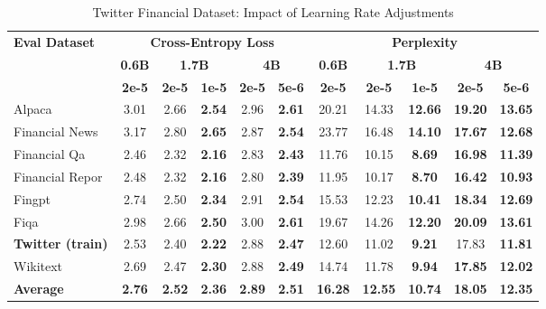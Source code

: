 
\begin{table}[h]
\centering
\caption[Twitter Financial: Learning Rate Comparison]{Twitter Financial Dataset: Impact of Learning Rate Adjustments}
\label{tab:twitter_lr_comparison}
\begin{tabular}{l|c|cc|cc|c|cc|cc}
\hline
\multirow{3}{*}{\textbf{Eval Dataset}} &
\multicolumn{5}{c|}{\textbf{Cross-Entropy Loss}} &
\multicolumn{5}{c}{\textbf{Perplexity}} \\
\cline{2-6} \cline{7-11}
& \textbf{0.6B} & \multicolumn{2}{c|}{\textbf{1.7B}} & \multicolumn{2}{c|}{\textbf{4B}} &
 \textbf{0.6B} & \multicolumn{2}{c|}{\textbf{1.7B}} & \multicolumn{2}{c}{\textbf{4B}} \\
\cline{3-4} \cline{5-6} \cline{8-9} \cline{10-11}
& \textbf{2e-5} & \textbf{2e-5} & \textbf{1e-5} & \textbf{2e-5} & \textbf{5e-6} &
 \textbf{2e-5} & \textbf{2e-5} & \textbf{1e-5} & \textbf{2e-5} & \textbf{5e-6} \\
\hline
 Alpaca & 3.01 & 2.66 & \textbf{2.54} & 2.96 & \textbf{2.61} & 20.21 & 14.33 & \textbf{12.66} & \textbf{19.20} & \textbf{13.65} \\
Financial News & 3.17 & 2.80 & \textbf{2.65} & 2.87 & \textbf{2.54} & 23.77 & 16.48 & \textbf{14.10} & \textbf{17.67} & \textbf{12.68} \\
Financial Qa & 2.46 & 2.32 & \textbf{2.16} & 2.83 & \textbf{2.43} & 11.76 & 10.15 & \textbf{8.69} & \textbf{16.98} & \textbf{11.39} \\
Financial Repor & 2.48 & 2.32 & \textbf{2.16} & 2.80 & \textbf{2.39} & 11.95 & 10.17 & \textbf{8.70} & \textbf{16.42} & \textbf{10.93} \\
Fingpt & 2.74 & 2.50 & \textbf{2.34} & 2.91 & \textbf{2.54} & 15.53 & 12.23 & \textbf{10.41} & \textbf{18.34} & \textbf{12.69} \\
Fiqa & 2.98 & 2.66 & \textbf{2.50} & 3.00 & \textbf{2.61} & 19.67 & 14.26 & \textbf{12.20} & \textbf{20.09} & \textbf{13.61} \\
\rowcolor{gray!20} \textbf{Twitter (train)} & 2.53 & 2.40 & \textbf{2.22} & 2.88 & \textbf{2.47} & 12.60 & 11.02 & \textbf{9.21} & 17.83 & \textbf{11.81} \\
Wikitext & 2.69 & 2.47 & \textbf{2.30} & 2.88 & \textbf{2.49} & 14.74 & 11.78 & \textbf{9.94} & \textbf{17.85} & \textbf{12.02} \\
\rowcolor{blue!10} \textbf{Average} & \textbf{2.76} & \textbf{2.52} & \textbf{2.36} & \textbf{2.89} & \textbf{2.51} & \textbf{16.28} & \textbf{12.55} & \textbf{10.74} & \textbf{18.05} & \textbf{12.35}  \\
\hline
\end{tabular}
\end{table}

